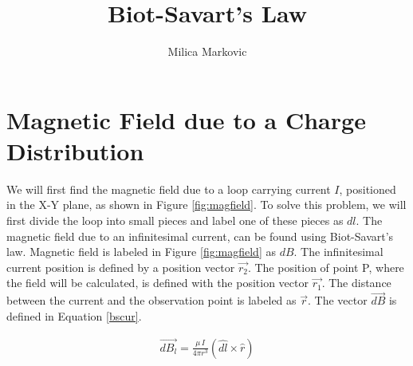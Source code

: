 \documentclass{ximera}
\title{Biot-Savart's Law}
\author{Milica Markovic}
\begin{document}
  
\begin{abstract}  

\end{abstract}  
\maketitle    


\section{Magnetic Field due to a Charge Distribution}






We will first find the magnetic field due to a loop carrying current $I$,  positioned in the X-Y plane, as shown in Figure \ref{fig:magfield}. To solve this problem, we will first divide the loop into small pieces and label one of these pieces as $dl$. The magnetic field due to an infinitesimal current, can be found using Biot-Savart's law. Magnetic field is labeled in Figure \ref{fig:magfield} as $dB$.  The infinitesimal current position is defined by a position vector $\vec{r_2}$. The position of point P, where the field will be calculated,  is defined with the position vector  $\vec{r_1}$. The distance between the current and the observation point is labeled as $\vec{r}$. The vector  $\vec{dB}$ is defined in  Equation  \ref{bscur}.


\begin{eqnarray}
\vec{dB_l}=\frac{\mu \,I }{4 \pi r^3} (\hat{dl} \times \hat{r})\label{bscur}
\end{eqnarray}
\end{document}
